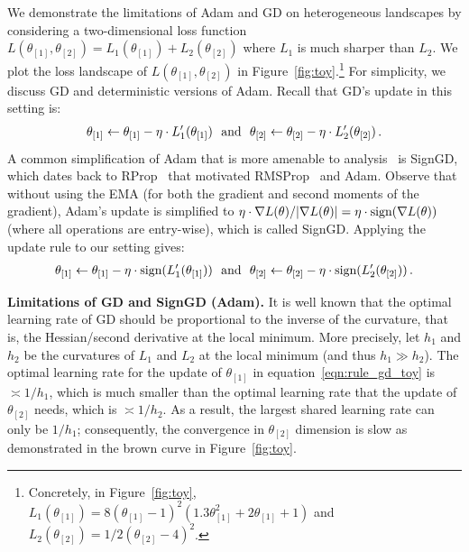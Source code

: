 We demonstrate the limitations of Adam and GD on heterogeneous landscapes by considering a two-dimensional loss function $L(\theta_{[1]},\theta_{[2]}) = L_1(\theta_{[1]}) + L_2(\theta_{[2]})$ where $L_1$ is much sharper than $L_2$. We plot the loss landscape of $L(\theta_{[1]},\theta_{[2]})$ in Figure~\ref{fig:toy}.\footnote{Concretely, in Figure~\ref{fig:toy}, $L_{1}(\theta_{[1]}) = 8(\theta_{[1]} - 1)^2(1.3\theta_{[1]}^2 + 2\theta_{[1]} + 1)$ and $L_2(\theta_{[2]}) = 1/2 (\theta_{[2]} - 4)^2$.}  
For simplicity, we discuss GD and deterministic versions of Adam. Recall that GD’s update in this setting is:
\begin{align}
\theta_{[1]} \leftarrow \theta_{[1]} - \eta \cdot L'_1(\theta_{[1]})\ \ \textup{and}\ \ \theta_{[2]} \leftarrow \theta_{[2]} - \eta\cdot L'_2(\theta_{[2]})\,.\label{eqn:rule_gd_toy}
\end{align}
A common simplification of Adam that is more amenable to analysis~\citep{balles2018dissecting,bernstein2018signsgd,zhuang2020adabelief,kunstner2023noise} is SignGD, which dates back to RProp~\citep{braun1992rprop} that motivated RMSProp~\citep{hinton2012neural} and Adam. 
Observe that without using the EMA (for both the gradient and second moments of the gradient), Adam's update is simplified to $\eta \cdot \nabla L(\theta)/|\nabla L(\theta)| = \eta\cdot \textup{sign}(\nabla L(\theta))$ (where all operations are entry-wise), which is called SignGD. Applying the update rule to our setting gives: 
\begin{align}
\theta_{[1]} \leftarrow \theta_{[1]} - \eta \cdot \textup{sign}(L'_1(\theta_{[1]}))\ \ \textup{and}\ \ \theta_{[2]} \leftarrow \theta_{[2]} - \eta \cdot \textup{sign}(L'_2(\theta_{[2]}))\,.
\end{align}

\textbf{Limitations of GD and SignGD (Adam).} It is well known that the optimal learning rate of GD should be proportional to the inverse of the curvature, that is, the Hessian/second derivative at the local minimum. More precisely, let $h_1$ and $h_2$ be the curvatures of $L_1$ and $L_2$  at the local minimum (and thus $h_1 \gg h_2$). The optimal learning rate for the update of $\theta_{[1]}$ in equation~\eqref{eqn:rule_gd_toy} is $\asymp 1/h_1$, which is much smaller than the optimal learning rate that the update of $\theta_{[2]}$ needs, which is $\asymp 1/h_2$. As a result, the largest shared learning rate can only be $1/h_1$; consequently, the convergence in $\theta_{[2]}$ dimension is slow as demonstrated in the brown curve in Figure~\ref{fig:toy}.

